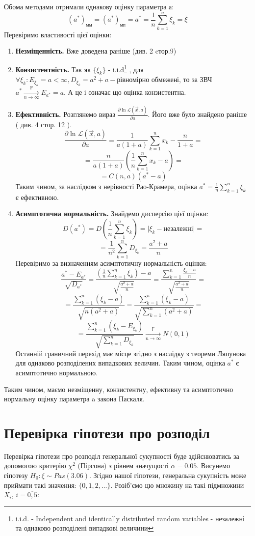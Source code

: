 \documentclass{article}
\begin{document}
Обома методами отримали однакову оцінку параметра а:
$$(a^*)_{\text{мм}} = (a^*)_{\text{мп}} = a^* = \frac{1}{n}
\sum_{k=1}^n \xi_k = \overline{\xi}$$
Перевіримо властивості цієї оцінки:
\begin{enumerate}
  \item \textbf{Незміщенність.} Вже доведена раніше (див. 2 cтор.9)
  \item \textbf{Конзистентність.} Так як $\{\xi_k\}$ - i.i.d\footnote{
    i.i.d. - Independent and identically distributed random variables 
    -  незалежні та однаково розподілені випадкові величини
  }
  , для $\forall \xi_k :E_{\xi_k} = a < \infty, D_{\xi_k} = a^2 + a - 
  \text{рівномірно обмежені}$, то за ЗВЧ
  \newline 
  $a^*\xrightarrow[n\to\infty]{\mathbb{P} }E_{a^*} = a$.
  А це і означає що оцінка конзистентна.
  \newpage
  \item \textbf{Ефективність.} Розглянемо вираз 
  $\frac{\partial\ln \mathcal{L}( \vec{x}, a )}{\partial a}$.
  Його вже було знайдено раніше ( див. 4 стор. 12 ).
  $$\frac{\partial\ln \mathcal{L}( \vec{x}, a )}{\partial a} = 
  \frac{1}{a(1+a)}\sum_{k=1}^n x_k - \frac{n}{1+a} = $$
  $$= \frac{n}{a(1+a)}(\frac{1}{n}\sum_{k=1}^n x_k - a) = $$
  $$= C(n, a)(a^* - a)$$
  Таким чином, за наслідком з нерівності Рао-Крамера, оцінка $a^* = 
  \frac{1}{n}\sum_{k=1}^n \xi_k$ є ефективною.
  \item \textbf{Асимптотична нормальність.} Знайдемо дисперсію 
  цієї оцінки:
  $$D(a^*) = D(\frac{1}{n}\sum_{k=1}^n \xi_k) = \bigg|\xi_k - 
  \text{незалежні}\bigg| 
  = $$
  $$= \frac{1}{n^2} \sum_{k=1}^nD_{\xi_k} = \frac{a^2 + a}{n}$$
  Перевіримо за визначенням асимптотичну нормальність оцінки:
  $$\frac{a^* - E_{a^*}}{\sqrt{D_{a^*}}} = 
  \frac{(\frac{1}{n}\sum_{k=1}^n \xi_k) - a}{\sqrt{\frac{a^2 + a}{n}}} = 
  \frac{\sum_{k=1}^n \frac{\xi_k - a}{n}}{\sqrt{\frac{a^2 + a}{n}}} = $$
  $$= \frac{\sum_{k=1}^n(\xi_k - a)}{\sqrt{n(a^2 + a)}} = 
  \frac{\sum_{k=1}^n(\xi_k - a)}{\sqrt{\sum_{k=1}^n(a^2 + a)}} =$$
  $$= \frac{\sum_{k=1}^n(\xi_k - E_{\xi_k})}{\sqrt{
  \sum_{k=1}^nD_{\xi_k}}} \xrightarrow[n\to\infty]{\mathbb{F} } 
  N(0, 1)$$
  Останній граничний перехід має місце згідно з наслідку з теореми 
  Ляпунова для однаково розподілених випадкових величин.
  Таким чином, оцінка $a^*$ є асимптотично нормальною.
\end{enumerate}
Таким чином, маємо незміщенну, конзистентну, ефективну та 
асимптотично нормальну оцінку параметра a закона Паскаля.
\section{Перевірка гіпотези про розподіл}
Перевірка гіпотези про розподіл генеральної сукупності буде здійснюватись 
за допомогою критерію $\chi^2$ (Пірсона)  з рівнем значущості $\alpha = 0.05$.
\newline
Висунемо гіпотезу $H_0: \xi \sim Pas(3.06)$. Згідно нашої гіпотези, 
генеральна сукупність може приймати такі значення: $\{0, 1, 2, \dots\}$.
Розіб'ємо цю множину на такі підмножини $X_i$, $i = \overline{0,5}$:
\end{document}
